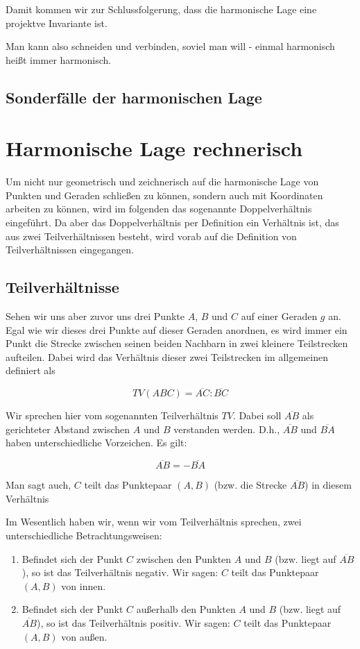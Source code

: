 \documentclass[12pt,a4paper]{article}
\begin{document}
Damit kommen wir zur Schlussfolgerung, dass die harmonische Lage eine projektve Invariante ist.

\glqq Man kann also schneiden und verbinden, soviel man will - einmal harmonisch heißt immer harmonisch.~\citep[s.~][S.~49]{projektiveGeometrie}\grqq

\subsection{Sonderfälle der harmonischen Lage}

\newpage
\section{Harmonische Lage rechnerisch}
Um nicht nur geometrisch und zeichnerisch auf die harmonische Lage von Punkten und Geraden schließen zu können, sondern auch mit Koordinaten arbeiten zu können, wird im folgenden das sogenannte Doppelverhältnis eingeführt. Da aber das Doppelverhältnis per Definition ein Verhältnis ist, das aus zwei Teilverhältnissen besteht, wird vorab auf die Definition von Teilverhältnissen eingegangen.

\subsection{Teilverhältnisse}
Sehen wir uns aber zuvor uns drei Punkte $A$, $B$ und $C$ auf einer Geraden $g$ an. Egal wie wir dieses drei Punkte auf dieser Geraden anordnen, es wird immer ein Punkt die Strecke zwischen seinen beiden Nachbarn in zwei kleinere Teilstrecken aufteilen. Dabei wird das Verhältnis dieser zwei Teilstrecken im allgemeinen definiert als

\[TV(A B C) = \overline{A C} : \overline{B C}\]

Wir sprechen hier vom sogenannten Teilverhältnis $TV$. Dabei soll $\overline{A B}$ als gerichteter Abstand zwischen $A$ und $B$ verstanden werden. D.h., $\overline{A B}$ und $\overline{B A}$ haben unterschiedliche Vorzeichen. Es gilt: 

\[\overline{A B} = -\overline{B A}\]

Man sagt auch, $C$ teilt das Punktepaar $(A , B)$ (bzw. die Strecke $\overline{A B}$) in diesem Verhältnis \citep[S.~76]{projektiveGeometrie}

Im Wesentlich haben wir, wenn wir vom Teilverhältnis sprechen, zwei unterschiedliche Betrachtungsweisen:
\begin{enumerate}
\item Befindet sich der Punkt $C$ zwischen den Punkten $A$ und $B$ (bzw. liegt auf $\overline{A B}$), so ist das Teilverhältnis negativ. Wir sagen: $C$ teilt das Punktepaar $(A , B)$ \glqq von innen\grqq .
\item Befindet sich der Punkt $C$ außerhalb den Punkten $A$ und $B$ (bzw. liegt auf $\overline{A B}$), so ist das Teilverhältnis positiv. Wir sagen: $C$ teilt das Punktepaar $(A , B)$ \glqq von außen\grqq .
\end{enumerate}
\end{document}
